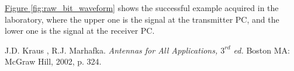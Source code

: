 \documentclass[12pt,a4paper]{report}
\begin{document}
\hyperref[fig:raw_bit_waveform]{Figure \ref*{fig:raw_bit_waveform}} shows the successful example acquired in the laboratory, where the upper one is the signal at the transmitter PC, and the lower one is the signal at the receiver PC.



\begin{thebibliography}{99}

    J.D. Kraus , R.J. Marhafka.
    \textit{Antennas for All Applications, $3^{rd}$ ed.}
    Boston MA: McGraw Hill, 2002, p. 324.

\end{thebibliography}
    
\end{document}
